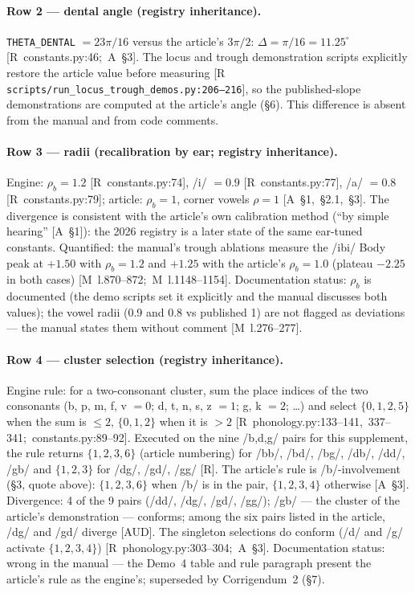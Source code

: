 \documentclass[11pt,letterpaper]{article}
\newcommand{\code}[1]{\texttt{#1}}
\begin{document}
\paragraph{Row 2 --- dental angle (registry inheritance).}
\code{THETA\_DENTAL} $=23\pi/16$ versus the article's $3\pi/2$:
$\Delta = \pi/16 = 11.25^{\circ}$
\hbox{[R constants.py:46; A \S3]}. The locus and trough demonstration scripts
explicitly restore the article value before measuring
{[R \code{scripts/}\allowbreak\code{run\_locus\_trough\_demos.py:206--216}]}, so the
published-slope demonstrations are computed at the article's angle (\S6).
This difference is absent from the manual and from code comments.

\paragraph{Row 3 --- radii (recalibration by ear; registry inheritance).}
Engine: $\rho_b = 1.2$ \hbox{[R constants.py:74]}, /i/ $=0.9$
\hbox{[R constants.py:77]}, /a/ $=0.8$ \hbox{[R constants.py:79]}; article:
$\rho_b = 1$, corner vowels $\rho = 1$ \hbox{[A \S1, \S2.1, \S3]}. The
divergence is consistent with the article's own calibration method
(``by simple hearing'' \hbox{[A \S1]}): the 2026 registry is a later state of
the same ear-tuned constants. Quantified: the manual's trough ablations
measure the /ibi/ Body peak at $+1.50$ with $\rho_b=1.2$ and $+1.25$ with the
article's $\rho_b=1.0$ (plateau $-2.25$ in both cases)
\hbox{[M l.870--872; M l.1148--1154]}. Documentation status: $\rho_b$ is
documented (the demo scripts set it explicitly and the manual discusses both
values); the vowel radii (0.9 and 0.8 vs published 1) are not flagged as
deviations --- the manual states them without comment \hbox{[M l.276--277]}.

\paragraph{Row 4 --- cluster selection (registry inheritance).}
Engine rule: for a two-consonant cluster, sum the place indices of the two
consonants (b, p, m, f, v $=0$; d, t, n, s, z $=1$; g, k $=2$; \dots) and
select $\{0,1,2,5\}$ when the sum is $\le 2$, $\{0,1,2\}$ when it is $>2$
\hbox{[R phonology.py:133--141, 337--341; constants.py:89--92]}. Executed on
the nine /b,d,g/ pairs for this supplement, the rule returns
$\{1,2,3,6\}$ (article numbering) for /bb/, /bd/, /bg/, /db/, /dd/, /gb/ and
$\{1,2,3\}$ for /dg/, /gd/, /gg/ \hbox{[R]}. The article's rule is
/b/-involvement (\S3, quote above): $\{1,2,3,6\}$ when /b/ is in the pair,
$\{1,2,3,4\}$ otherwise \hbox{[A \S3]}. Divergence: 4 of the 9 pairs
(/dd/, /dg/, /gd/, /gg/); /gb/ --- the cluster of the article's
demonstration --- conforms; among the six pairs listed in the article, /dg/
and /gd/ diverge \hbox{[AUD]}. The singleton selections do conform (/d/ and
/g/ activate $\{1,2,3,4\}$) \hbox{[R phonology.py:303--304; A \S3]}.
Documentation status: wrong in the manual --- the Demo~4 table and rule
paragraph present the article's rule as the engine's; superseded by
Corrigendum~2 (\S7).
\end{document}
